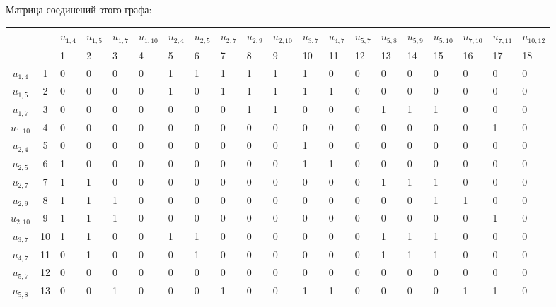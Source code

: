 \documentclass[12pt, a4paper] {ncc}
\begin{document}
Матрица соединений этого графа:

{\scriptsize\begin{tabularx}{\textwidth}{|c| c|X X X X X X X X X X X X X X X X X X}
\hline
& & $u_{1,4}$ & $u_{1,5}$ & $u_{1,7}$ & $u_{1,10}$ & $u_{2,4}$ & $u_{2,5}$ & $u_{2,7}$ & $u_{2,9}$ & $u_{2,10}$ & $u_{3,7}$ & $u_{4,7}$ & $u_{5,7}$ & $u_{5,8}$ & $u_{5,9}$ & $u_{5,10}$ & $u_{7,10}$ & $u_{7,11}$ & $u_{10,12}$ \\ \hline
& & 1 & 2 & 3 & 4 & 5 & 6 & 7 & 8& 9 & 10 & 11 & 12 & 13 & 14 & 15 & 16 & 17 & 18 \\ \hline
$u_{1,4}$   & 1  & 0 & 0 & 0  & 0  & 1  & 1 & 1  & 1  & 1  & 1  & 0  & 0  & 0  & 0  & 0  & 0  & 0   & 0 \\ \hline
$u_{1,5}$   & 2  & 0 & 0 & 0  & 0  & 1  & 0 & 1  & 1  & 1  & 1  & 1  & 0  & 0  & 0  & 0  & 0  & 0   & 0 \\ \hline
$u_{1,7}$   & 3  & 0 & 0 & 0  & 0  & 0  & 0 & 0  & 1  & 1  & 0  & 0  & 0  & 1  & 1  & 1  & 0  & 0   & 0 \\ \hline
$u_{1,10}$  & 4  & 0 & 0 & 0  & 0  & 0  & 0 & 0  & 0  & 0  & 0  & 0  & 0  & 0  & 0  & 0  & 0  & 1   & 0 \\ \hline
$u_{2,4}$   & 5  & 0 & 0 & 0  & 0  & 0  & 0 & 0  & 0  & 0  & 1  & 0  & 0  & 0  & 0  & 0  & 0  & 0   & 0 \\ \hline
$u_{2,5}$   & 6  & 1 & 0 & 0  & 0  & 0  & 0 & 0  & 0  & 0  & 1  & 1  & 0  & 0  & 0  & 0  & 0  & 0   & 0 \\ \hline
$u_{2,7}$   & 7  & 1 & 1 & 0  & 0  & 0  & 0 & 0  & 0  & 0  & 0  & 0  & 0  & 1  & 1  & 1  & 0  & 0   & 0 \\ \hline
$u_{2,9}$   & 8  & 1 & 1 & 1  & 0  & 0  & 0 & 0  & 0  & 0  & 0  & 0  & 0  & 0  & 0  & 1  & 1  & 0   & 0 \\ \hline
$u_{2,10}$  & 9  & 1 & 1 & 1  & 0  & 0  & 0 & 0  & 0  & 0  & 0  & 0  & 0  & 0  & 0  & 0  & 0  & 1   & 0 \\ \hline
$u_{3,7}$   &10  & 1 & 1 & 0  & 0  & 1  & 1 & 0  & 0  & 0  & 0  & 0  & 0  & 1  & 1  & 1  & 0  & 0   & 0 \\ \hline
$u_{4,7}$   &11  & 0 & 1 & 0  & 0  & 0  & 1 & 0  & 0  & 0  & 0  & 0  & 0  & 1  & 1  & 1  & 0  & 0   & 0 \\ \hline
$u_{5,7}$   &12  & 0 & 0 & 0  & 0  & 0  & 0 & 0  & 0  & 0  & 0  & 0  & 0  & 0  & 0  & 0  & 0  & 0   & 0 \\ \hline
$u_{5,8}$   &13  & 0 & 0 & 1  & 0  & 0  & 0 & 1  & 0  & 0  & 1  & 1  & 0  & 0  & 0  & 0  & 1  & 1   & 0 \\ \hline

\end{tabularx}}
\end{document}
